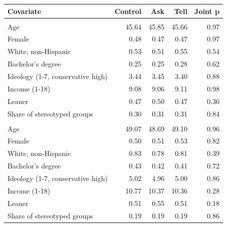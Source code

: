 
\begin{tabular}{lrrrr}
\toprule
Covariate & Control & Ask & Tell & Joint p\\
\midrule
\addlinespace[0.3em]
\multicolumn{5}{l}{\textit{Democrats}}\\
\hspace{1em}Age & 45.64 & 45.85 & 45.66 & 0.97\\
\hspace{1em}Female & 0.48 & 0.47 & 0.47 & 0.97\\
\hspace{1em}White, non-Hispanic & 0.53 & 0.51 & 0.55 & 0.54\\
\hspace{1em}Bachelor's degree & 0.25 & 0.25 & 0.28 & 0.62\\
\hspace{1em}Ideology (1-7, conservative high) & 3.44 & 3.45 & 3.40 & 0.88\\
\hspace{1em}Income (1-18) & 9.08 & 9.06 & 9.11 & 0.98\\
\hspace{1em}Leaner & 0.47 & 0.50 & 0.47 & 0.36\\
\hspace{1em}Share of stereotyped groups & 0.30 & 0.31 & 0.31 & 0.84\\
\addlinespace[0.3em]
\multicolumn{5}{l}{\textit{Republicans}}\\
\hspace{1em}Age & 49.07 & 48.69 & 49.10 & 0.96\\
\hspace{1em}Female & 0.50 & 0.51 & 0.53 & 0.82\\
\hspace{1em}White, non-Hispanic & 0.83 & 0.78 & 0.81 & 0.39\\
\hspace{1em}Bachelor's degree & 0.43 & 0.42 & 0.41 & 0.72\\
\hspace{1em}Ideology (1-7, conservative high) & 5.02 & 4.96 & 5.00 & 0.86\\
\hspace{1em}Income (1-18) & 10.77 & 10.37 & 10.36 & 0.28\\
\hspace{1em}Leaner & 0.51 & 0.55 & 0.51 & 0.18\\
\hspace{1em}Share of stereotyped groups & 0.19 & 0.19 & 0.19 & 0.86\\
\bottomrule
\end{tabular}
